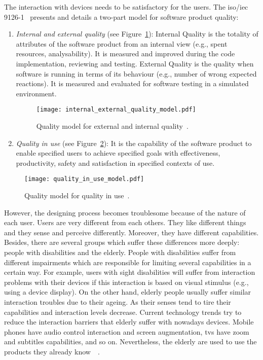 The interaction with devices needs to be satisfactory for the users. The 
\acs{iso}/\acs{iec} 9126-1~\citep{isoiec1} presents and details a two-part model 
for software product quality:

\begin{enumerate}
  \item \textit{Internal and external quality} (see Figure~\ref{fig:ie_q_model}):
  Internal Quality is the totality of attributes of the software product from an
  internal view (e.g., spent resources, analysability). It is measured and
  improved during the code implementation, reviewing and testing. External 
  Quality is the quality when software is running in terms of its behaviour 
  (e.g., number of wrong expected reactions). It is measured and evaluated for 
  software testing in a simulated environment.
  
\begin{figure}[H]
\centering
\texttt{[image: internal\_external\_quality\_model.pdf]}
\caption{Quality model for external and internal quality~\citep{isoiec1}.}
\label{fig:ie_q_model}
\end{figure}
  
  \item \textit{Quality in use} (see Figure~\ref{fig:qu_model}): It is the capability of
  the software product to enable specified users to achieve specified goals with
  effectiveness, productivity, safety and satisfaction in specified contexts of
  use.
\end{enumerate}


\begin{figure}[H]
\centering
\texttt{[image: quality\_in\_use\_model.pdf]}
\caption{Quality model for quality in use~\citep{isoiec1}.}
\label{fig:qu_model}
\end{figure}

However, the designing process becomes troublesome because of the nature of each
user. Users are very different from each others. They like different things and they
sense and perceive differently. Moreover, they have different capabilities.
Besides, there are several groups which suffer these differences more deeply:
people with disabilities and the elderly. People with disabilities suffer from 
different impairments which are responsible for limiting several capabilities 
in a certain way. For example, users with sight disabilities will suffer from 
interaction problems with their devices if this interaction is based on visual 
stimulus (e.g., using a device display). On the other hand, elderly people 
usually suffer similar interaction troubles due to their ageing. As their 
senses tend to tire their capabilities and interaction levels decrease. Current 
technology trends try to reduce the interaction barriers that elderly suffer 
with nowadays devices. Mobile phones have audio control interaction and screen 
augmentation, \acsp{tv} have zoom and subtitles capabilities, and so on. 
Nevertheless, the elderly are used to use the products they already 
know~\citep{roupa_use_2010}~\citep{elderly_tech}.

